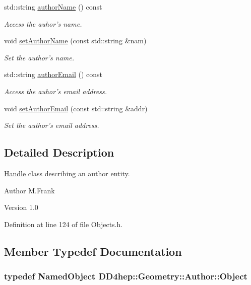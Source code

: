 \begin{DoxyCompactItemize}
std::string \hyperlink{class_d_d4hep_1_1_geometry_1_1_author_afd39c0164d6dc9322fba81f4718c1b16}{authorName} () const 
\begin{DoxyCompactList}\small\item\em Access the auhor's name. \item\end{DoxyCompactList}\item 
void \hyperlink{class_d_d4hep_1_1_geometry_1_1_author_aca1a9559e7b890d4b817b1a5286a034a}{setAuthorName} (const std::string \&nam)
\begin{DoxyCompactList}\small\item\em Set the author's name. \item\end{DoxyCompactList}\item 
std::string \hyperlink{class_d_d4hep_1_1_geometry_1_1_author_a00e4790124ad6e3e3fe6db864629e9f9}{authorEmail} () const 
\begin{DoxyCompactList}\small\item\em Access the auhor's email address. \item\end{DoxyCompactList}\item 
void \hyperlink{class_d_d4hep_1_1_geometry_1_1_author_a0e51de9a1fef12422800b96164296ae4}{setAuthorEmail} (const std::string \&addr)
\begin{DoxyCompactList}\small\item\em Set the author's email address. \item\end{DoxyCompactList}\end{DoxyCompactItemize}


\subsection{Detailed Description}
\hyperlink{class_d_d4hep_1_1_handle}{Handle} class describing an author entity. \begin{DoxyAuthor}{Author}
M.Frank 
\end{DoxyAuthor}
\begin{DoxyVersion}{Version}
1.0 
\end{DoxyVersion}


Definition at line 124 of file Objects.h.

\subsection{Member Typedef Documentation}
\hypertarget{class_d_d4hep_1_1_geometry_1_1_author_a253185ac4c6734b22d0b2f6b8161bf11}{
\subsubsection[{Object}]{\setlength{\rightskip}{0pt plus 5cm}typedef {\bf NamedObject} {\bf DD4hep::Geometry::Author::Object}}}
\label{class_d_d4hep_1_1_geometry_1_1_author_a253185ac4c6734b22d0b2f6b8161bf11}



